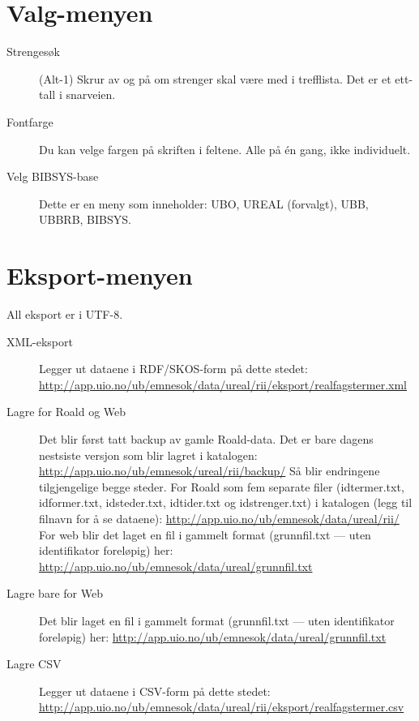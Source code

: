 \documentclass[a4paper,norsk,11pt]{article}
\begin{document}
\section{Valg-menyen}
\begin{description}
 \item[Strengesøk] (Alt-1) Skrur av og på om strenger skal være med i trefflista. Det er et ett-tall i snarveien.
 \item[Fontfarge] Du kan velge fargen på skriften i feltene. Alle på én gang, ikke individuelt.
 \item[Velg BIBSYS-base] Dette er en meny som inneholder: UBO, UREAL (forvalgt), UBB, UBBRB, BIBSYS.
\end{description} 

\section{Eksport-menyen}\label{eksport}
All eksport er i UTF-8.
\begin{description}
 \item[XML-eksport] Legger ut dataene i RDF/SKOS-form på dette stedet:\newline
{\footnotesize 
\url{http://app.uio.no/ub/emnesok/data/ureal/rii/eksport/realfagstermer.xml}}
 \item[Lagre for Roald og Web] Det blir først tatt backup av gamle Roald-data. Det er bare dagens nestsiste versjon som blir lagret i katalogen:\newline
{\footnotesize 
\url{http://app.uio.no/ub/emnesok/ureal/rii/backup/}}\newline
Så blir endringene tilgjengelige begge steder. For Roald som fem separate filer (idtermer.txt, idformer.txt, idsteder.txt, idtider.txt og idstrenger.txt) i katalogen (legg til filnavn for å se dataene):\newline
{\footnotesize 
\url{http://app.uio.no/ub/emnesok/data/ureal/rii/}}\newline
For web blir det laget en fil i gammelt format (grunnfil.txt --- uten identifikator foreløpig) her:\newline
{\footnotesize 
\url{http://app.uio.no/ub/emnesok/data/ureal/grunnfil.txt}}
 \item[Lagre bare for Web] Det blir laget en fil i gammelt format (grunnfil.txt --- uten identifikator foreløpig) her:\newline
{\footnotesize 
\url{http://app.uio.no/ub/emnesok/data/ureal/grunnfil.txt}}
 \item[Lagre CSV] Legger ut dataene i CSV-form på dette stedet:\newline
{\footnotesize 
\url{http://app.uio.no/ub/emnesok/data/ureal/rii/eksport/realfagstermer.csv}}
\end{description}
\end{document}
